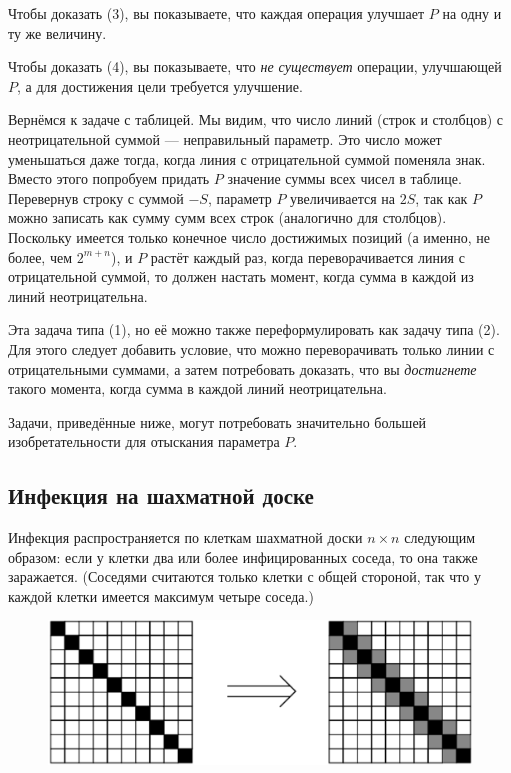 Чтобы доказать (3), вы показываете, что каждая операция улучшает $P$ на одну и ту же величину.

Чтобы доказать (4), вы показываете, что \emph{не существует} операции, улучшающей $P$, а для достижения цели требуется улучшение.

\medskip

Вернёмся к задаче с таблицей.
Мы видим, что число линий (строк и столбцов) с неотрицательной суммой --- неправильный параметр.
Это число может уменьшаться даже тогда, когда линия с отрицательной суммой поменяла знак.
Вместо этого попробуем придать $P$ значение суммы всех чисел в таблице.
Перевернув строку с суммой $-S$, параметр $P$ увеличивается на $2S$, так как $P$ можно записать как сумму сумм всех строк (аналогично для столбцов).
Поскольку имеется только конечное число достижимых позиций
(а именно, не более, чем $2^{m+n}$), и $P$ растёт каждый раз, когда переворачивается линия с отрицательной суммой, то должен настать момент, когда сумма в каждой из линий неотрицательна.

Эта задача типа (1), но её можно также переформулировать как задачу типа (2).
Для этого следует добавить условие, что можно переворачивать только линии с отрицательными суммами, а затем потребовать доказать, что вы \emph{достигнете} такого момента, когда сумма в каждой линий неотрицательна.

\medskip

{
\sloppy

Задачи, приведённые ниже, могут потребовать значительно большей изобретательности для отыскания параметра $P$.

}

\subsection*{Инфекция на шахматной доске}%

Инфекция распространяется по клеткам шахматной доски $n \times n$ следующим образом: если у клетки два или более инфицированных соседа, то она также заражается.
(Соседями считаются только клетки с общей стороной, так что у каждой клетки имеется максимум четыре соседа.)

\begin{figure}[h!]
\centering
\includegraphics[scale=0.6]{Figs/Algorithms/diag}
\end{figure}


